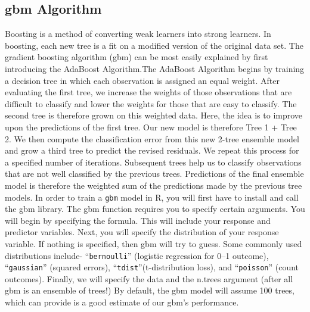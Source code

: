 \documentclass[
]{book}
\begin{document}
\hypertarget{gbm-algorithm-1}{%
\subsection{gbm Algorithm}\label{gbm-algorithm-1}}

Boosting is a method of converting weak learners into strong learners. In boosting, each new tree is a fit on a modified version of the original data set. The gradient boosting algorithm (gbm) can be most easily explained by first introducing the AdaBoost Algorithm.The AdaBoost Algorithm begins by training a decision tree in which each observation is assigned an equal weight. After evaluating the first tree, we increase the weights of those observations that are difficult to classify and lower the weights for those that are easy to classify. The second tree is therefore grown on this weighted data. Here, the idea is to improve upon the predictions of the first tree. Our new model is therefore Tree 1 + Tree 2. We then compute the classification error from this new 2-tree ensemble model and grow a third tree to predict the revised residuals. We repeat this process for a specified number of iterations. Subsequent trees help us to classify observations that are not well classified by the previous trees. Predictions of the final ensemble model is therefore the weighted sum of the predictions made by the previous tree models.
In order to train a \texttt{gbm} model in R, you will first have to install and call the gbm library. The gbm function requires you to specify certain arguments. You will begin by specifying the formula. This will include your response and predictor variables. Next, you will specify the distribution of your response variable. If nothing is specified, then gbm will try to guess. Some commonly used distributions include- ``\texttt{bernoulli}'' (logistic regression for 0--1 outcome), ``\texttt{gaussian}'' (squared errors), ``\texttt{tdist}''(t-distribution loss), and ``\texttt{poisson}'' (count outcomes). Finally, we will specify the data and the n.trees argument (after all gbm is an ensemble of trees!) By default, the gbm model will assume 100 trees, which can provide is a good estimate of our gbm's performance.
\end{document}
